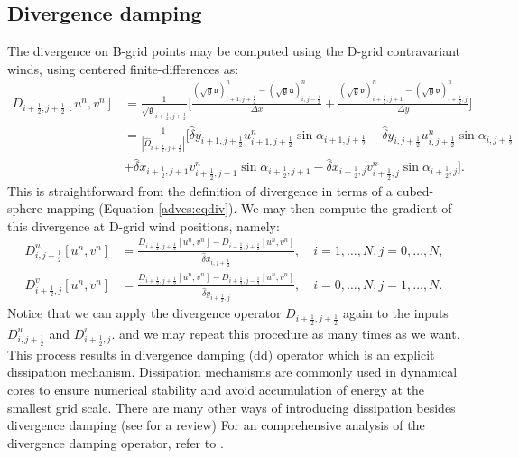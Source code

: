 \subsection{Divergence damping}
\label{dd-cs}
The divergence on B-grid points may be computed using the D-grid contravariant winds, using centered finite-differences as:
\begin{align*}
	\label{2d-sw-divdamp}
	D_{i+\frac{1}{2},j+\frac{1}{2}}[u^n,v^n] &=
	\frac{1}{\sqrt{\mathfrak{g}}_{i+\frac{1}{2},j+\frac{1}{2}}}\bigg[
	\frac{(\sqrt{\mathfrak{g}}\mathfrak{u})_{i+1,j+\frac{1}{2}}^n-(\sqrt{\mathfrak{g}}\mathfrak{u})_{i,j-\frac{1}{2}}^n}{\Delta x}+
	\frac{(\sqrt{\mathfrak{g}}\mathfrak{v})_{i+\frac{1}{2},j+1}^n-(\sqrt{\mathfrak{g}}\mathfrak{v})_{i+\frac{1}{2},j}^n}{\Delta y}
	\bigg]\nonumber\\
	&= 
	\frac{1}{|\hat{\Omega}_{i+\frac{1}{2},j+\frac{1}{2}}|}\bigg[
	{\hat{\delta}y_{i+1,j+\frac{1}{2}}{u}_{i+1,j+\frac{1}{2}}^n\sin{\alpha}_{i+1,j+\frac{1}{2}}-
	 \hat{\delta}y_{i  ,j+\frac{1}{2}}{u}_{i  ,j+\frac{1}{2}}^n\sin{\alpha}_{i  ,j+\frac{1}{2}}}\\
	&+{\hat{\delta}x_{i+\frac{1}{2},j+1}{v}_{i+\frac{1}{2},j+1}^n\sin{\alpha}_{i+\frac{1}{2},j+1}-
 	   \hat{\delta}x_{i+\frac{1}{2},j  }{v}_{i+\frac{1}{2},j  }^n\sin{\alpha}_{i+\frac{1}{2},j  }}
	\bigg].
\end{align*}
This is straightforward from the definition of divergence in terms of a cubed-sphere mapping (Equation \eqref{advcs:eqdiv}).
We may then compute the gradient of this divergence at D-grid wind positions, namely:
\begin{align}
	D^u_{i,j+\frac{1}{2}}[u^n,v^n] &= \frac{D_{i+\frac{1}{2},j+\frac{1}{2}}[u^n,v^n]- D_{i-\frac{1}{2},j+\frac{1}{2}}[u^n,v^n]}{\hat{\delta}x_{i,j+\frac{1}{2}}},
	\quad i=1,\ldots,N, j=0,\ldots,N,\\
	D^v_{i+\frac{1}{2},j}[u^n,v^n] &= \frac{D_{i+\frac{1}{2},j+\frac{1}{2}}[u^n,v^n]- D_{i+\frac{1}{2},j-\frac{1}{2}}[u^n,v^n]}{\hat{\delta}y_{i+\frac{1}{2},j}},
	\quad i=0,\ldots,N, j=1,\ldots,N.
\end{align}
Notice that we can apply the divergence operator $D_{i+\frac{1}{2},j+\frac{1}{2}}$
again to the inputs $D^u_{i,j+\frac{1}{2}}$ and $D^v_{i+\frac{1}{2},j}$.
and we may repeat this procedure as many times as we want.
This process results in divergence damping (dd) operator which is an explicit dissipation mechanism.
Dissipation mechanisms are commonly used in dynamical cores to ensure numerical stability and avoid accumulation of energy at the smallest grid scale.
There are many other ways of introducing dissipation besides divergence damping (see \citet{jablonowski:2011} for a review)
For an comprehensive analysis of the divergence damping operator, refer to \citet{whitehead:2011}. 


